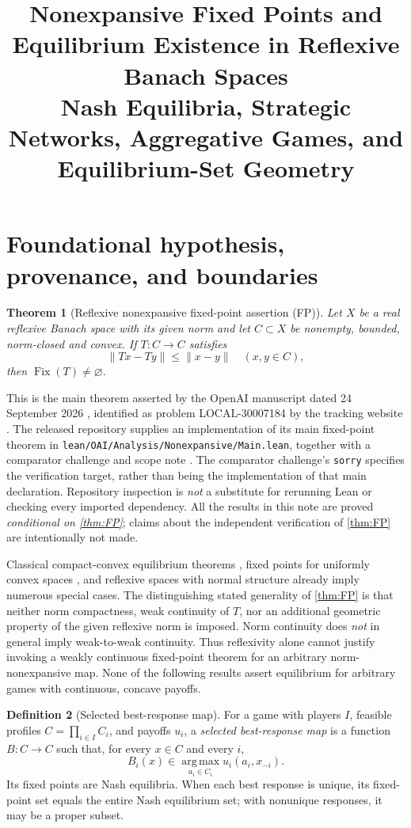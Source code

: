 \documentclass[11pt]{article}
\title{Nonexpansive Fixed Points and Equilibrium Existence in Reflexive Banach Spaces\\\large Nash Equilibria, Strategic Networks, Aggregative Games, and Equilibrium-Set Geometry}
\newtheorem{theorem}{Theorem}[section]
\theoremstyle{definition}\newtheorem{definition}[theorem]{Definition}
\newcommand{\Fix}{\operatorname{Fix}}
\newcommand{\argmax}{\operatorname*{arg\,max}}
\begin{document}
\section{Foundational hypothesis, provenance, and boundaries}
\begin{theorem}[Reflexive nonexpansive fixed-point assertion (FP)\label{thm:FP}]
Let $X$ be a real reflexive Banach space with its given norm and let $C\subset X$ be nonempty, bounded, norm-closed and convex. If $T:C\to C$ satisfies
\begin{equation}\label{eq:nonexp}\|Tx-Ty\|\le\|x-y\|\quad(x,y\in C),\end{equation}
then $\Fix(T)\ne\varnothing$.
\end{theorem}
This is the main theorem asserted by the OpenAI manuscript dated 24 September 2026 \cite{OAIFP}, identified as problem LOCAL-30007184 by the tracking website \cite{Tracker}. The released repository supplies an implementation of its main fixed-point theorem in \texttt{lean/OAI/Analysis/Nonexpansive/Main.lean}, together with a comparator challenge and scope note \cite{LeanMain,LeanScope,LeanComparator}. The comparator challenge's \texttt{sorry} specifies the verification target, rather than being the implementation of that main declaration. Repository inspection is \emph{not} a substitute for rerunning Lean or checking every imported dependency. All the results in this note are proved \emph{conditional on \cref{thm:FP}}; claims about the independent verification of \cref{thm:FP} are intentionally not made.

Classical compact-convex equilibrium theorems \cite{Glicksberg1952}, fixed points for uniformly convex spaces \cite{Browder1965,Gohde1965}, and reflexive spaces with normal structure \cite{Kirk1965} already imply numerous special cases. The distinguishing stated generality of \cref{thm:FP} is that neither norm compactness, weak continuity of $T$, nor an additional geometric property of the given reflexive norm is imposed. Norm continuity does \emph{not} in general imply weak-to-weak continuity. Thus reflexivity alone cannot justify invoking a weakly continuous fixed-point theorem for an arbitrary norm-nonexpansive map. None of the following results assert equilibrium for arbitrary games with continuous, concave payoffs.

\begin{definition}[Selected best-response map]
For a game with players $I$, feasible profiles $C=\prod_{i\in I}C_i$, and payoffs $u_i$, a \emph{selected best-response map} is a function $B:C\to C$ such that, for every $x\in C$ and every $i$,
\[B_i(x)\in \argmax_{a_i\in C_i}u_i(a_i,x_{-i}).\]
Its fixed points are Nash equilibria. When each best response is unique, its fixed-point set equals the entire Nash equilibrium set; with nonunique responses, it may be a proper subset.
\end{definition}
\end{document}
